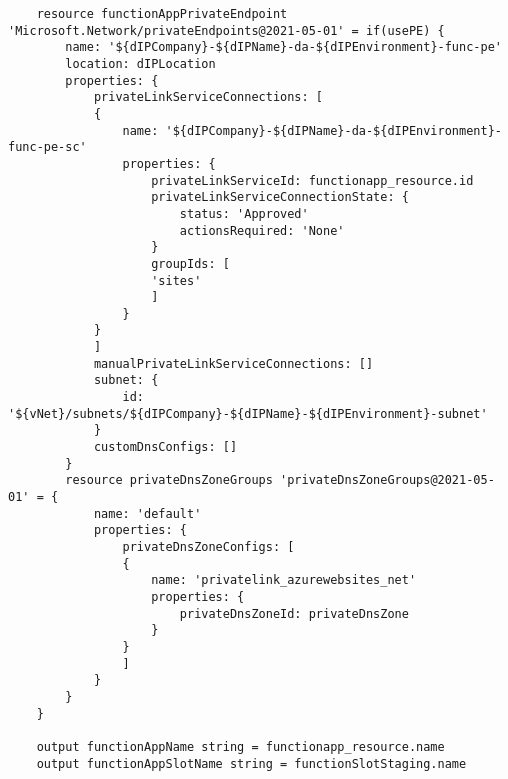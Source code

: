 \documentclass[dutch,dit,thesis]{hogentreport}
\begin{document}
\begin{lstlisting}
    resource functionAppPrivateEndpoint 'Microsoft.Network/privateEndpoints@2021-05-01' = if(usePE) {
        name: '${dIPCompany}-${dIPName}-da-${dIPEnvironment}-func-pe'
        location: dIPLocation
        properties: {
            privateLinkServiceConnections: [
            {
                name: '${dIPCompany}-${dIPName}-da-${dIPEnvironment}-func-pe-sc'
                properties: {
                    privateLinkServiceId: functionapp_resource.id
                    privateLinkServiceConnectionState: {
                        status: 'Approved'
                        actionsRequired: 'None'
                    }
                    groupIds: [
                    'sites'
                    ]
                }
            }
            ]
            manualPrivateLinkServiceConnections: []
            subnet: {
                id: '${vNet}/subnets/${dIPCompany}-${dIPName}-${dIPEnvironment}-subnet'
            }
            customDnsConfigs: []
        }
        resource privateDnsZoneGroups 'privateDnsZoneGroups@2021-05-01' = {
            name: 'default'
            properties: {
                privateDnsZoneConfigs: [
                {
                    name: 'privatelink_azurewebsites_net'
                    properties: {
                        privateDnsZoneId: privateDnsZone
                    }
                }
                ]
            }
        }
    }

    output functionAppName string = functionapp_resource.name
    output functionAppSlotName string = functionSlotStaging.name
\end{lstlisting}
\end{document}

